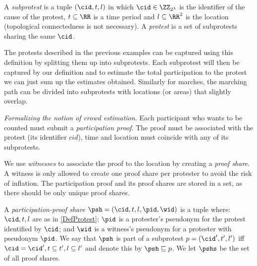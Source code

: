 
\begin{definition}[Protest]\label{DefProtest}
  A \emph{subprotest} is a tuple \((\cid, t, l)\) in which \(\cid\in 
    \ZZ_{2^\lambda}\) is the identifier of the cause of the protest,
  \(t \subseteq \RR\) is a time period and \(l \subseteq \RR^2\) is the location 
  (topological connectedness is not necessary).
  A \emph{protest} is a set of subprotests sharing the same \(\cid\).
\end{definition}

The protests described in the previous examples can be captured using this definition by splitting 
them up into subprotests.
Each subprotest will then be captured by our definition and to estimate the total participation to the protest we can just sum up the estimates obtained.
Similarly for marches, the marching path can be divided into subprotests with 
locations (or areas) that slightly overlap.

\emph{Formalizing the notion of crowd estimation.} Each participant who wants to 
be counted must submit a \emph{participation proof}.
The proof must be associated with the protest (\ie its identifier \(cid\)), time and location must coincide with any of its subprotests.

We use \emph{witnesses} to associate the proof to the location by creating a 
\emph{proof share}.
A witness is only allowed to create one proof share per protester to avoid the 
risk of inflation.
The participation proof and its proof shares are stored in a set, as there should be only unique proof shares.


\begin{definition}%
  \label{DefProofShare}\label{DefProofShares}
  A \emph{participation-proof share} \(\psh = (\cid, t, l, \pid, \wid)\) is a 
  tuple where:
  \(\cid, t, l\) are as in \cref{DefProtest};
  \(\pid\) is a protester's pseudonym for the protest identified by \(\cid\); 
  and
  \(\wid\) is a witness's pseudonym for a protester with pseudonym \(\pid\).
  We say that \(\psh\) is part of a subprotest \(p = (\cid', t', l')\) iff 
  \(\cid = \cid', t\subseteq t', l\subseteq l'\) and denote this by \(\psh 
    \sqsubseteq p\).
  We let \(\pshs\) be the set of all proof shares.
\end{definition}

